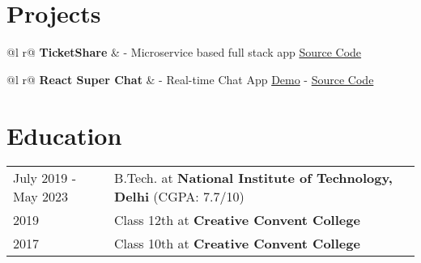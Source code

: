 \documentclass[a4paper,12pt]{article}
\begin{document}
\section{Projects}

\begin{tabularx}{\linewidth}{ @{}l r@{} }
\textbf{TicketShare} & - Microservice based full stack app \hfill \href{https://github.com/Hardik5862/ticketshare}{Source Code} \\[3.75pt]
\end{tabularx}

\begin{tabularx}{\linewidth}{ @{}l r@{} }
\textbf{React Super Chat} & - Real-time Chat App \hfill \href{https://react-super-chat-460bb.web.app}{Demo} - \href{https://github.com/Hardik5862/ticketshare}{Source Code} \\[3.75pt]
\end{tabularx}

\section{Education}
\begin{tabularx}{\linewidth}{@{}l X@{}}	
July 2019 - May 2023 & B.Tech. at \textbf{National Institute of Technology, Delhi} \hfill \normalsize (CGPA: 7.7/10) \\

2019 & Class 12th at \textbf{Creative Convent College} \\

2017 & Class 10th at \textbf{Creative Convent College} \\
\end{tabularx}
\end{document}
